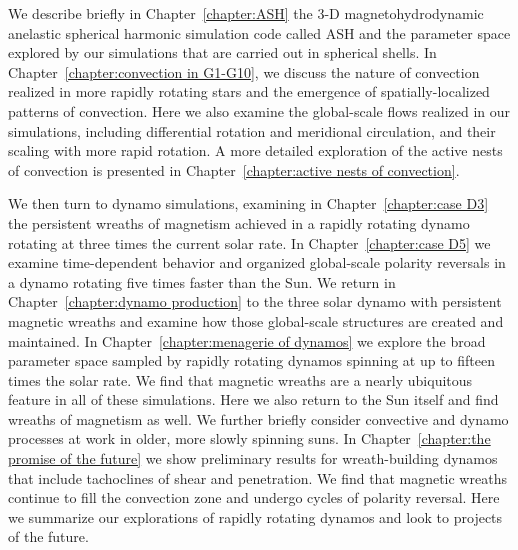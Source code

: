 We describe briefly in Chapter~\ref{chapter:ASH} the 3-D
magnetohydrodynamic anelastic spherical harmonic simulation code
called ASH and the parameter space explored by our simulations that
are carried out in spherical shells. In
Chapter~\ref{chapter:convection in G1-G10}, we discuss the nature of
convection realized in more rapidly rotating stars and the emergence
of spatially-localized patterns of convection.  Here we also examine
the global-scale flows realized in our simulations, including
differential rotation and meridional circulation, and their scaling
with more rapid rotation.  A more detailed exploration of the active
nests of convection is presented in Chapter~\ref{chapter:active nests
of convection}.

We then turn to dynamo simulations, examining in
Chapter~\ref{chapter:case D3} the persistent wreaths of magnetism
achieved in a rapidly rotating dynamo rotating at three times the
current solar rate.  In Chapter~\ref{chapter:case D5} we examine
time-dependent behavior and organized global-scale polarity
reversals in a dynamo rotating five times faster than the Sun. 
We return in Chapter~\ref{chapter:dynamo production} to the three solar dynamo 
with persistent magnetic wreaths and examine how those global-scale
structures are created and maintained.   
In Chapter~\ref{chapter:menagerie of dynamos} we explore the broad
parameter space sampled by rapidly rotating dynamos spinning at up to
fifteen times the solar rate.  We find that magnetic wreaths are a
nearly ubiquitous feature in all of these simulations.  Here we also return to the
Sun itself and find wreaths of magnetism as well.  We further briefly consider
convective and dynamo processes at work in older, more slowly spinning
suns. In Chapter~\ref{chapter:the promise of the future} we show
preliminary results for wreath-building dynamos that include
tachoclines of shear and penetration.  We find that magnetic wreaths
continue to fill the convection zone and undergo cycles of polarity
reversal.  Here we summarize our explorations of rapidly rotating
dynamos and look to projects of the future. 




